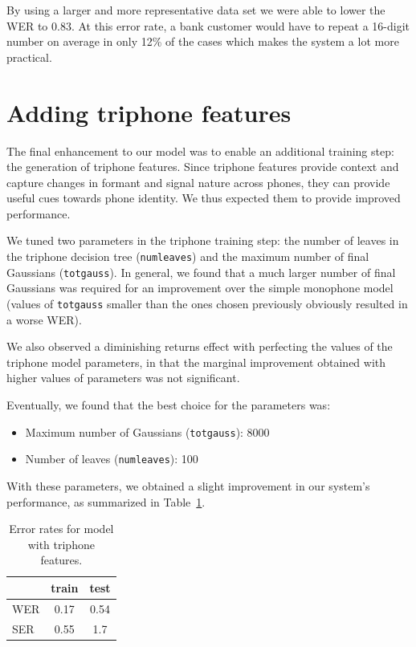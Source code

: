 \documentclass[twocolumn, 11pt]{article}
\begin{document}
By using a larger and  more representative data set we were able to lower the
WER to 0.83. At this error rate, a bank customer would have to repeat a 16-digit
number on average in only 12\% of the cases which makes the system a lot more
practical.




\section{Adding triphone features}

The final enhancement to our model was to enable an additional training step:
the generation of triphone features. Since triphone features provide context and
capture changes in formant and signal nature across phones, they can provide
useful cues towards phone identity. We thus expected them to provide improved
performance.

We tuned two parameters in the triphone training step: the number of leaves in
the triphone decision tree (\texttt{numleaves}) and the maximum number of final
Gaussians (\texttt{totgauss}). In general, we found that a much larger number of
final Gaussians was required for an improvement over the simple monophone model
(values of \texttt{totgauss} smaller than the ones chosen previously obviously
resulted in a worse WER).

We also observed a diminishing returns effect with perfecting the values of the
triphone model parameters, in that the marginal improvement obtained with higher
values of parameters was not significant.

Eventually, we found that the best choice for the parameters was:
\begin{itemize}
  \item Maximum number of Gaussians (\texttt{totgauss}): 8000
  \item Number of leaves (\texttt{numleaves}): 100
\end{itemize}

With these parameters, we obtained a slight improvement in our system's
performance, as summarized in Table~\ref{tab:wer-triphone}.

\begin{table}[h]\centering
  \begin{tabular}{lcc}
    \toprule
    & train & test \\
    \midrule
    WER & 0.17 & 0.54 \\
    SER & 0.55 & 1.7 \\
    \bottomrule
  \end{tabular}
  \caption{Error rates for model with triphone features.}\label{tab:wer-triphone}
\end{table}
\end{document}
